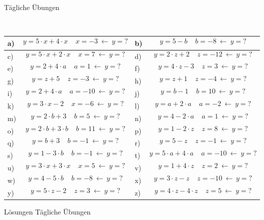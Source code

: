 \documentclass[12pt]{article}
\begin{document}
\centerline{{\Large Tägliche Übungen}} 
\vspace{1cm}
\noindent \\


\begin{xltabular}{\textwidth}{|C{0.75cm}|X|C{0.75cm}|X|}
\hline
a)&$$y=5 \cdot x + 4 \cdot x~~~~~ x=-3 ~ \leftarrow ~ y=?$$
&
b)&$$y=5 - b~~~~~ b=-8 ~ \leftarrow ~ y=?$$
\\\hline
c)&$$y=5 \cdot x + 2 \cdot x~~~~~ x=7 ~ \leftarrow ~ y=?$$
&
d)&$$y=2 \cdot z + 2~~~~~ z=-12 ~ \leftarrow ~ y=?$$
\\\hline
e)&$$y=2 + 4 \cdot a~~~~~ a=1 ~ \leftarrow ~ y=?$$
&
f)&$$y=4 \cdot z - 3~~~~~ z=3 ~ \leftarrow ~ y=?$$
\\\hline
g)&$$y=z + 5~~~~~ z=-3 ~ \leftarrow ~ y=?$$
&
h)&$$y=z + 1~~~~~ z=-4 ~ \leftarrow ~ y=?$$
\\\hline
i)&$$y=2 + 4 \cdot a~~~~~ a=-10 ~ \leftarrow ~ y=?$$
&
j)&$$y=b - 1~~~~~ b=10 ~ \leftarrow ~ y=?$$
\\\hline
k)&$$y=3 \cdot x - 2~~~~~ x=-6 ~ \leftarrow ~ y=?$$
&
l)&$$y=a + 2 \cdot a~~~~~ a=-2 ~ \leftarrow ~ y=?$$
\\\hline
m)&$$y=2 \cdot b + 3~~~~~ b=5 ~ \leftarrow ~ y=?$$
&
n)&$$y=4 - 2 \cdot a~~~~~ a=1 ~ \leftarrow ~ y=?$$
\\\hline
o)&$$y=2 \cdot b + 3 \cdot b~~~~~ b=11 ~ \leftarrow ~ y=?$$
&
p)&$$y=1 - 2 \cdot z~~~~~ z=8 ~ \leftarrow ~ y=?$$
\\\hline
q)&$$y=b + 3~~~~~ b=-1 ~ \leftarrow ~ y=?$$
&
r)&$$y=5 - z~~~~~ z=-1 ~ \leftarrow ~ y=?$$
\\\hline
s)&$$y=1 - 3 \cdot b~~~~~ b=-1 ~ \leftarrow ~ y=?$$
&
t)&$$y=5 \cdot a + 4 \cdot a~~~~~ a=-10 ~ \leftarrow ~ y=?$$
\\\hline
u)&$$y=3 \cdot x + 3 \cdot x~~~~~ x=5 ~ \leftarrow ~ y=?$$
&
v)&$$y=1 + 4 \cdot z~~~~~ z=2 ~ \leftarrow ~ y=?$$
\\\hline
w)&$$y=4 - 5 \cdot b~~~~~ b=-8 ~ \leftarrow ~ y=?$$
&
x)&$$y=3 \cdot z - z~~~~~ z=-10 ~ \leftarrow ~ y=?$$
\\\hline
y)&$$y=5 \cdot z - 2~~~~~ z=3 ~ \leftarrow ~ y=?$$
&
z)&$$y=4 \cdot z - 4 \cdot z~~~~~ z=5 ~ \leftarrow ~ y=?$$
\\\hline
\end{xltabular}
\vspace{0.5cm}
\newpage
{}
\centerline{{\large Lösungen Tägliche Übungen}} 
\vspace{0.5cm}
\end{document}
